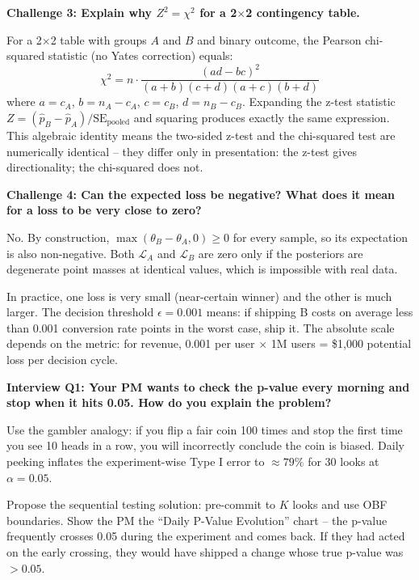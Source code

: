 \begin{challengebox}
  \textbf{Challenge 3: Explain why $Z^2 = \chi^2$ for a 2$\times$2 contingency
  table.}

  For a 2$\times$2 table with groups $A$ and $B$ and binary outcome, the Pearson
  chi-squared statistic (no Yates correction) equals:
  \[
    \chi^2 = n \cdot \frac{(ad - bc)^2}{(a+b)(c+d)(a+c)(b+d)}
  \]
  where $a = c_A$, $b = n_A - c_A$, $c = c_B$, $d = n_B - c_B$.
  Expanding the z-test statistic $Z = (\hat{p}_B - \hat{p}_A) /
  \mathrm{SE}_{\mathrm{pooled}}$ and squaring produces exactly the same
  expression. This algebraic identity means the two-sided z-test and the
  chi-squared test are numerically identical -- they differ only in
  presentation: the z-test gives directionality; the chi-squared does not.
\end{challengebox}

\begin{challengebox}
  \textbf{Challenge 4: Can the expected loss be negative? What does it mean
  for a loss to be very close to zero?}

  No. By construction, $\max(\theta_B - \theta_A, 0) \geq 0$ for every sample,
  so its expectation is also non-negative. Both $\mathcal{L}_A$ and
  $\mathcal{L}_B$ are zero only if the posteriors are degenerate point masses at
  identical values, which is impossible with real data.

  In practice, one loss is very small (near-certain winner) and the other is
  much larger. The decision threshold $\epsilon = 0.001$ means: if shipping B
  costs on average less than 0.001 conversion rate points in the worst case,
  ship it. The absolute scale depends on the metric: for revenue, 0.001 per
  user $\times$ 1M users = \$1{,}000 potential loss per decision cycle.
\end{challengebox}

\begin{interviewbox}
  \textbf{Interview Q1: Your PM wants to check the p-value every morning and
  stop when it hits 0.05. How do you explain the problem?}

  Use the gambler analogy: if you flip a fair coin 100 times and stop the first
  time you see 10 heads in a row, you will incorrectly conclude the coin is
  biased. Daily peeking inflates the experiment-wise Type I error to
  $\approx 79\%$ for 30 looks at $\alpha = 0.05$.

  Propose the sequential testing solution: pre-commit to $K$ looks and use
  OBF boundaries. Show the PM the ``Daily P-Value Evolution'' chart -- the
  p-value frequently crosses 0.05 during the experiment and comes back. If
  they had acted on the early crossing, they would have shipped a change whose
  true p-value was $>0.05$.
\end{interviewbox}

